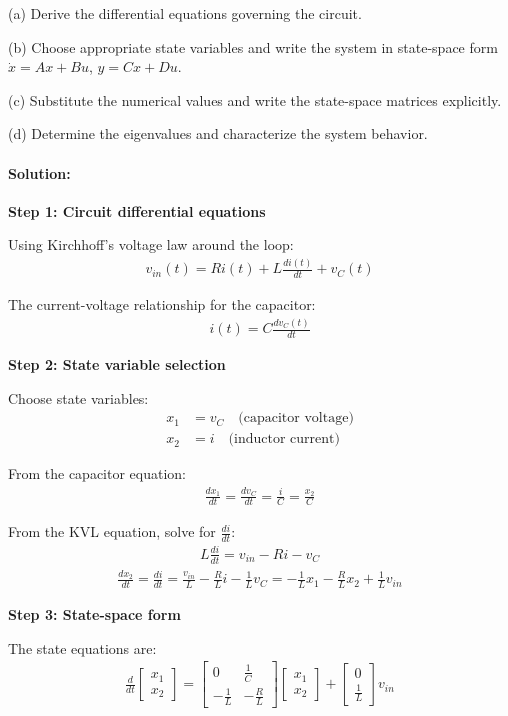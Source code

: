 \documentclass[11pt,a4paper]{article}
\begin{document}
(a) Derive the differential equations governing the circuit.

(b) Choose appropriate state variables and write the system in state-space form $\dot{x} = Ax + Bu$, $y = Cx + Du$.

(c) Substitute the numerical values and write the state-space matrices explicitly.

(d) Determine the eigenvalues and characterize the system behavior.

\paragraph{Solution:}

\textbf{Step 1: Circuit differential equations}

Using Kirchhoff's voltage law around the loop:
\begin{align}
v_{in}(t) = Ri(t) + L\frac{di(t)}{dt} + v_C(t)
\end{align}

The current-voltage relationship for the capacitor:
\begin{align}
i(t) = C\frac{dv_C(t)}{dt}
\end{align}

\textbf{Step 2: State variable selection}

Choose state variables:
\begin{align}
x_1 &= v_C \quad \text{(capacitor voltage)} \\
x_2 &= i \quad \text{(inductor current)}
\end{align}

From the capacitor equation:
\begin{align}
\frac{dx_1}{dt} = \frac{dv_C}{dt} = \frac{i}{C} = \frac{x_2}{C}
\end{align}

From the KVL equation, solve for $\frac{di}{dt}$:
\begin{align}
L\frac{di}{dt} = v_{in} - Ri - v_C
\end{align}
\begin{align}
\frac{dx_2}{dt} = \frac{di}{dt} = \frac{v_{in}}{L} - \frac{R}{L}i - \frac{1}{L}v_C = -\frac{1}{L}x_1 - \frac{R}{L}x_2 + \frac{1}{L}v_{in}
\end{align}

\textbf{Step 3: State-space form}

The state equations are:
\begin{align}
\frac{d}{dt}\begin{bmatrix} x_1 \\ x_2 \end{bmatrix} = \begin{bmatrix} 0 & \frac{1}{C} \\ -\frac{1}{L} & -\frac{R}{L} \end{bmatrix}\begin{bmatrix} x_1 \\ x_2 \end{bmatrix} + \begin{bmatrix} 0 \\ \frac{1}{L} \end{bmatrix}v_{in}
\end{align}
\end{document}

